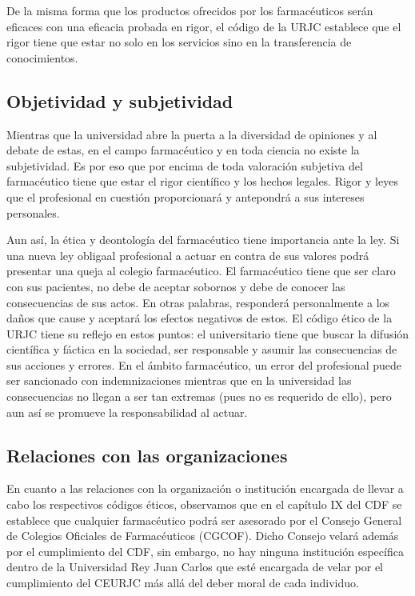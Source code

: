 \documentclass[11pt,a4paper]{article}
\begin{document}
De la misma forma que los productos ofrecidos por los farmacéuticos serán eficaces con una eficacia probada en rigor, el código de la URJC establece que el rigor tiene que estar no solo en los servicios sino en la transferencia de conocimientos.

\subsection{Objetividad y subjetividad}
Mientras que la universidad abre la puerta a la diversidad de opiniones y al debate de estas, en el campo farmacéutico y en toda ciencia no existe la subjetividad. Es por eso que por encima de toda valoración subjetiva del farmacéutico tiene que estar el rigor científico y los hechos legales. Rigor y leyes que el profesional en cuestión proporcionará y antepondrá a sus intereses personales. 

Aun así, la ética y deontología del farmacéutico tiene importancia ante la ley. Si una nueva ley obligaal profesional a actuar en contra de sus valores podrá presentar una queja al colegio farmacéutico. El farmacéutico tiene que ser claro con sus pacientes, no debe de aceptar sobornos y debe de conocer las consecuencias de sus actos. En otras palabras, responderá personalmente a los daños que cause y aceptará los efectos negativos de estos. El código ético de la URJC tiene su reflejo en estos puntos: el universitario tiene que buscar la difusión científica y fáctica en la sociedad, ser responsable y asumir las consecuencias de sus acciones y errores. En el ámbito farmacéutico, un error del profesional puede ser sancionado con indemnizaciones mientras que en la universidad las consecuencias no llegan a ser tan extremas (pues no es requerido de ello), pero aun así se promueve la responsabilidad al actuar.

\subsection{Relaciones con las organizaciones}
En cuanto a las relaciones con la organización o institución encargada de llevar a cabo los respectivos códigos éticos, observamos que en el capítulo IX del CDF se establece que cualquier farmacéutico podrá ser asesorado por el Consejo General de Colegios Oficiales de Farmacéuticos (CGCOF). Dicho Consejo velará además por el cumplimiento del CDF, sin embargo, no hay ninguna institución específica dentro de la Universidad Rey Juan Carlos que esté encargada de velar por el cumplimiento del CEURJC más allá del deber moral de cada individuo.
\end{document}
